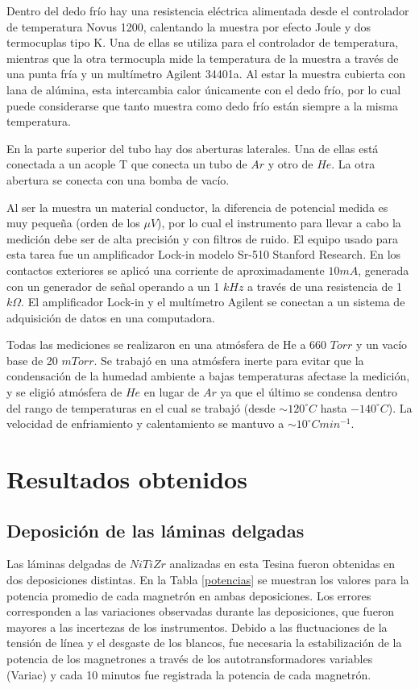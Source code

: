 \documentclass[12pt]{article}
\theoremstyle{definition}
\theoremstyle{remark}
\begin{document}
{Dentro del dedo frío hay una resistencia eléctrica alimentada desde el controlador de temperatura Novus 1200, calentando la muestra por efecto Joule y dos termocuplas tipo K. Una de ellas se utiliza para el controlador de temperatura, mientras que la otra termocupla mide la temperatura de la muestra a través de una punta fría y un multímetro Agilent 34401a. Al estar la muestra cubierta con lana de alúmina, esta intercambia calor únicamente con el dedo frío, por lo cual puede considerarse que tanto muestra como dedo frío están siempre a la misma temperatura.

En la parte superior del tubo hay dos aberturas laterales. Una de ellas está conectada a un acople T que conecta un tubo de $Ar$ y otro de $He$. La otra abertura se conecta con una bomba de vacío.

Al ser la muestra un material conductor, la diferencia de potencial medida es muy pequeña (orden de los $\mu V$), por lo cual el instrumento para llevar a cabo la medición debe ser de alta precisión y con filtros de ruido. El equipo usado para esta tarea fue un amplificador Lock-in modelo Sr-510 Stanford Research. En los contactos exteriores se aplicó una corriente de aproximadamente $10mA$, generada con un generador de señal operando a un 1 $kHz$ a través de una resistencia de 1$k\Omega$. El amplificador Lock-in y el multímetro Agilent se conectan a un sistema de adquisición de datos en una computadora. 

Todas las mediciones se realizaron en una atmósfera de He a 660 $Torr$ y un vacío base de 20 $mTorr$. Se trabajó en una atmósfera inerte para evitar que la condensación de la humedad ambiente a bajas temperaturas afectase la medición, y se eligió atmósfera de $He$ en lugar de $Ar$ ya que el último se condensa dentro del rango de temperaturas en el cual se trabajó (desde $\sim 120 ^\circ C$ hasta $-140 ^\circ C$). La velocidad de enfriamiento y calentamiento se mantuvo a $\sim10^\circ C min^{-1}$.

\newpage
\section{Resultados obtenidos}

\subsection{Deposición de las láminas delgadas}

Las láminas  delgadas de $NiTiZr$ analizadas en esta Tesina fueron obtenidas en dos deposiciones distintas. En la Tabla \ref{potencias} se muestran los valores para la potencia promedio de cada magnetrón en ambas deposiciones. Los errores corresponden a las variaciones observadas durante las deposiciones, que fueron mayores a las incertezas de los instrumentos. Debido a las fluctuaciones de la tensión de línea y el desgaste de los blancos, fue necesaria la estabilización de la potencia de los magnetrones a través de los autotransformadores variables (Variac) y cada 10 minutos fue registrada la potencia de cada magnetrón.

}
\end{document}
